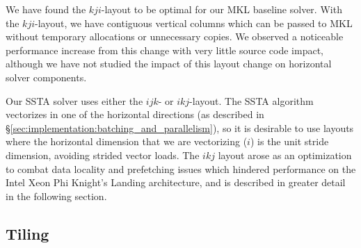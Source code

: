 \documentclass{sig-alternate-05-2015}
\begin{document}
We have found the \(kji\)-layout to be optimal for our MKL baseline solver.
With the \(kji\)-layout, we have contiguous vertical columns which can be
  passed to MKL without temporary allocations or unnecessary copies.
We observed a noticeable performance increase from this change with very
  little source code impact, although we have not studied the impact of this
  layout change on horizontal solver components.


Our SSTA solver uses either the \(ijk\)- or \(ikj\)-layout.
The SSTA algorithm vectorizes in one of the horizontal directions (as described
  in \S\ref{sec:implementation:batching_and_parallelism}), so it is desirable to
  use layouts where the horizontal dimension that we are vectorizing (\(i\)) is
  the unit stride dimension, avoiding strided vector loads.
The \(ikj\) layout arose as an optimization to combat data locality and prefetching
  issues which hindered performance on the Intel Xeon Phi Knight's Landing
  architecture, and is described in greater detail in the following section.

\subsection{Tiling}
\label{sec:implementation:tiling}
\end{document}
